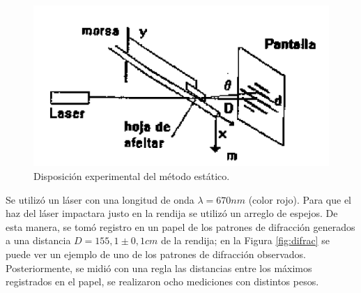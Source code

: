 \documentclass[twoside,twocolumn,a4paper]{article}
\begin{document}
\begin{figure}[H]
\includegraphics[width=\linewidth]{disenoestatico.png}
\caption{Disposici\'on experimental del m\'etodo est\'atico.}
\label{fig:disenoestatico}
\end{figure}

Se utiliz\'o un l\'aser con una longitud de onda $\lambda= 670 nm$ (color rojo). Para que el haz del l\'aser impactara justo en la rendija se utiliz\'o un arreglo de espejos. De esta manera, se tom\'o registro en un papel de los patrones de difracci\'on generados a una distancia $D = 155,1 \pm 0,1 cm$ de la rendija; en la Figura \ref{fig:difrac} se puede ver un ejemplo de uno de los patrones de difracci\'on observados. Posteriormente, se midi\'o con una regla las distancias entre los m\'aximos registrados en el papel, se realizaron ocho mediciones con distintos pesos.
\end{document}
